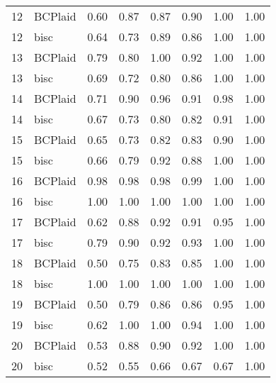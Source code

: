 \begin{table}[ht]
\begin{tabular}{rlrrrrrr}
   12 & BCPlaid & 0.60 & 0.87 & 0.87 & 0.90 & 1.00 & 1.00 \\ 
   12 & bisc & 0.64 & 0.73 & 0.89 & 0.86 & 1.00 & 1.00 \\ 
   13 & BCPlaid & 0.79 & 0.80 & 1.00 & 0.92 & 1.00 & 1.00 \\ 
   13 & bisc & 0.69 & 0.72 & 0.80 & 0.86 & 1.00 & 1.00 \\ 
   14 & BCPlaid & 0.71 & 0.90 & 0.96 & 0.91 & 0.98 & 1.00 \\ 
   14 & bisc & 0.67 & 0.73 & 0.80 & 0.82 & 0.91 & 1.00 \\ 
   15 & BCPlaid & 0.65 & 0.73 & 0.82 & 0.83 & 0.90 & 1.00 \\ 
   15 & bisc & 0.66 & 0.79 & 0.92 & 0.88 & 1.00 & 1.00 \\ 
   16 & BCPlaid & 0.98 & 0.98 & 0.98 & 0.99 & 1.00 & 1.00 \\ 
   16 & bisc & 1.00 & 1.00 & 1.00 & 1.00 & 1.00 & 1.00 \\ 
   17 & BCPlaid & 0.62 & 0.88 & 0.92 & 0.91 & 0.95 & 1.00 \\ 
   17 & bisc & 0.79 & 0.90 & 0.92 & 0.93 & 1.00 & 1.00 \\ 
   18 & BCPlaid & 0.50 & 0.75 & 0.83 & 0.85 & 1.00 & 1.00 \\ 
   18 & bisc & 1.00 & 1.00 & 1.00 & 1.00 & 1.00 & 1.00 \\ 
   19 & BCPlaid & 0.50 & 0.79 & 0.86 & 0.86 & 0.95 & 1.00 \\ 
   19 & bisc & 0.62 & 1.00 & 1.00 & 0.94 & 1.00 & 1.00 \\ 
   20 & BCPlaid & 0.53 & 0.88 & 0.90 & 0.92 & 1.00 & 1.00 \\ 
   20 & bisc & 0.52 & 0.55 & 0.66 & 0.67 & 0.67 & 1.00 \\ 
   \bottomrule
\end{tabular}
\end{table}
